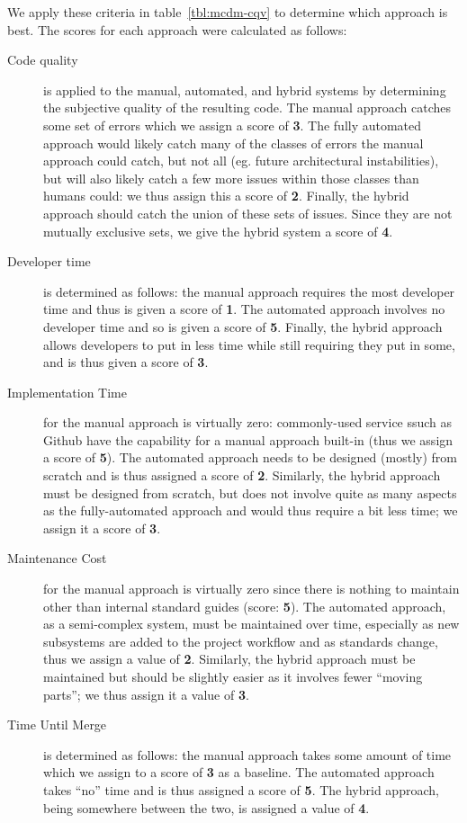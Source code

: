 \documentclass[12pt]{article}
\begin{document}
We apply these criteria in table~\ref{tbl:mcdm-cqv} to determine which approach is best. The scores for each approach were calculated as follows:
\begin{description}
\item[Code quality] is applied to the manual, automated, and hybrid systems by determining the subjective quality of the resulting code. The manual approach catches some set of errors which we assign a score of {\bf 3}. The fully automated approach would likely catch many of the classes of errors the manual approach could catch, but not all (eg. future architectural instabilities), but will also likely catch a few more issues within those classes than humans could: we thus assign this a score of {\bf 2}. Finally, the hybrid approach should catch the union of these sets of issues. Since they are not mutually exclusive sets, we give the hybrid system a score of {\bf 4}.
\item[Developer time] is determined as follows: the manual approach requires the most developer time and thus is given a score of {\bf 1}. The automated approach involves no developer time and so is given a score of {\bf 5}. Finally, the hybrid approach allows developers to put in less time while still requiring they put in some, and is thus given a score of {\bf 3}.
\item[Implementation Time] for the manual approach is virtually zero: commonly-used service ssuch as Github have the capability for a manual approach built-in (thus we assign a score of {\bf 5}). The automated approach needs to be designed (mostly) from scratch and is thus assigned a score of {\bf 2}. Similarly, the hybrid approach must be designed from scratch, but does not involve quite as many aspects as the fully-automated approach and would thus require a bit less time; we assign it a score of {\bf 3}.
\item[Maintenance Cost] for the manual approach is virtually zero since there is nothing to maintain other than internal standard guides (score: {\bf 5}). The automated approach, as a semi-complex system, must be maintained over time, especially as new subsystems are added to the project workflow and as standards change, thus we assign a value of {\bf 2}. Similarly, the hybrid approach must be maintained but should be slightly easier as it involves fewer ``moving parts''; we thus assign it a value of {\bf 3}.
\item[Time Until Merge] is determined as follows: the manual approach takes some amount of time which we assign to a score of {\bf 3} as a baseline. The automated approach takes ``no'' time and is thus assigned a score of {\bf 5}. The hybrid approach, being somewhere between the two, is assigned a value of {\bf 4}.
\end{description}
\end{document}
